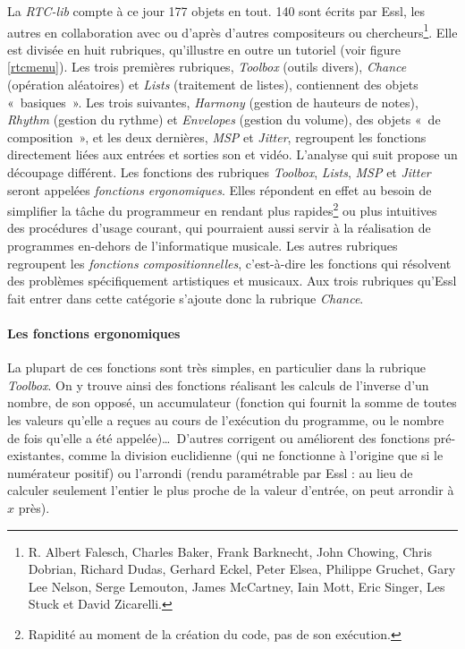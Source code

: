 \documentclass[a4paper,12pt]{article}
\newcommand{\guill}[1]{«~#1~»}
\begin{document}
La \emph{RTC-lib} compte à ce jour 177 objets en tout. 140 sont écrits par Essl, les autres en collaboration avec ou d'après d'autres compositeurs ou chercheurs\footnote{R. Albert Falesch, Charles Baker, Frank Barknecht, John Chowing, Chris Dobrian, Richard Dudas, Gerhard Eckel, Peter Elsea, Philippe Gruchet, Gary Lee Nelson, Serge Lemouton, James McCartney, Iain Mott, Eric Singer, Les Stuck et David Zicarelli.}. Elle est divisée en huit rubriques, qu'illustre en outre un tutoriel (voir figure \ref{rtcmenu}). Les trois premières rubriques, \emph{Toolbox} (outils divers), \emph{Chance} (opération aléatoires) et \emph{Lists} (traitement de listes), contiennent des objets \guill{basiques}. Les trois suivantes, \emph{Harmony} (gestion de hauteurs de notes), \emph{Rhythm} (gestion du rythme) et \emph{Envelopes} (gestion du volume), des objets \guill{de composition}, et les deux dernières, \emph{MSP} et \emph{Jitter}, regroupent les fonctions directement liées aux entrées et sorties son et vidéo. L'analyse qui suit propose un découpage différent. Les fonctions des rubriques \emph{Toolbox}, \emph{Lists}, \emph{MSP} et \emph{Jitter} seront appelées \emph{fonctions ergonomiques}. Elles répondent en effet au besoin de simplifier la tâche du programmeur en rendant plus rapides\footnote{Rapidité au moment de la création du code, pas de son exécution.} ou plus intuitives des procédures d'usage courant, qui pourraient aussi servir à la réalisation de programmes en-dehors de l'informatique musicale. Les autres rubriques regroupent les \emph{fonctions compositionnelles}, c'est-à-dire les fonctions qui résolvent des problèmes spécifiquement artistiques et musicaux. Aux trois rubriques qu'Essl fait entrer dans cette catégorie s'ajoute donc la rubrique \emph{Chance}.

\paragraph{Les fonctions ergonomiques}

La plupart de ces fonctions sont très simples, en particulier dans la rubrique \emph{Toolbox}. On y trouve ainsi des fonctions réalisant les calculs de l'inverse d'un nombre, de son opposé, un accumulateur (fonction qui fournit la somme de toutes les valeurs qu'elle a reçues au cours de l'exécution du programme, ou le nombre de fois qu'elle a été appelée)\dots~D'autres corrigent ou améliorent des fonctions pré-existantes, comme la division euclidienne (qui ne fonctionne à l'origine que si le numérateur positif) ou l'arrondi (rendu paramétrable par Essl : au lieu de calculer seulement l'entier le plus proche de la valeur d'entrée, on peut arrondir à $x$ près).
\end{document}
